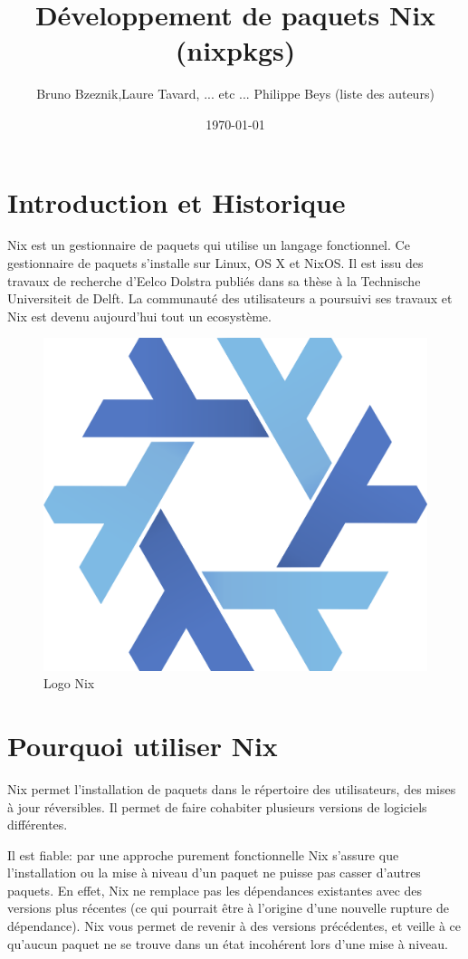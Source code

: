 \documentclass[final]{beamer}
\title
[JDEV 2017, 4ème édition des Journées nationales du DEVeloppement logiciel, Marseille, 4, 5, 6 et 7 juillet 2017.] %
{ %
Développement de paquets Nix (nixpkgs)
}
\author{ %
Bruno Bzeznik\inst{2},Laure Tavard\inst{2}, ... etc ... Philippe Beys (liste des auteurs)\inst{1}
}
\institute
[CNRS/UGA] %
{
\inst{1} Service Informatique, Laboratoire LIPHY, UMR5588, CNRS, Université Grenoble Alpes\\[0.3ex]
\inst{2} UMS GriCAD, CNRS, Université Grenoble Alpes\\[0.3ex]
}
\date{\today}
\begin{document}
\begin{frame}[fragile]
\begin{multicols}{3}
\section{Introduction et Historique}

Nix\cite{ref1} est un gestionnaire de paquets qui utilise un langage fonctionnel. Ce gestionnaire de paquets s'installe sur Linux, OS X et NixOS. Il est issu des travaux de recherche d'Eelco Dolstra\cite{ref2} publiés dans sa thèse\cite{ref3}  à la Technische Universiteit de Delft. La communauté des utilisateurs a poursuivi ses travaux et Nix est devenu   aujourd'hui tout un ecosystème.   
\begin{figure}
\centering
\includegraphics[width=0.49\columnwidth]{nixos-logo.png}
\caption{Logo Nix}
\end{figure}
\section{Pourquoi utiliser Nix}

Nix permet l'installation de paquets dans le répertoire des utilisateurs, des mises à jour réversibles. Il permet de faire cohabiter plusieurs versions de logiciels différentes.

\vspace{0.5cm}
Il est fiable: par une approche purement fonctionnelle Nix s'assure que l'installation ou la mise à niveau d'un paquet ne puisse pas casser d'autres paquets. En effet, Nix ne remplace pas les dépendances existantes avec des versions plus récentes (ce qui pourrait être à l'origine d'une nouvelle rupture de dépendance). Nix vous permet de revenir à des versions précédentes, et veille à ce qu'aucun paquet ne se trouve dans un état incohérent lors d'une mise à niveau.


\end{multicols}
\end{frame}
\end{document}
